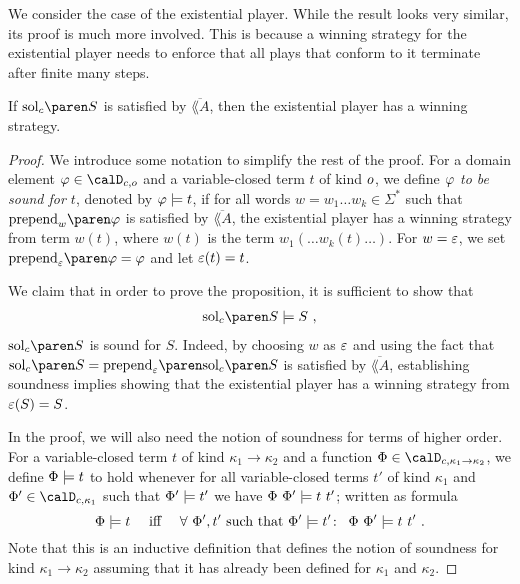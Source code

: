 \documentclass[../../diss.tex]{subfiles}
\begin{document}
We consider the case of the existential player.
While the result looks very similar, its proof is much more involved.
This is because a winning strategy for the existential player needs to enforce that all plays that conform to it terminate after finite many steps.

\begin{proposition}%
\label{Proposition:HORSConcreteSolExistential}%
    If $\solc{S}$ is satisfied by $\overline{\lang{A}}$, then the existential player has a winning strategy.
\end{proposition}

\begin{proof}
    We introduce some notation to simplify the rest of the proof.
    For a domain element
    $\judgmentground \in \domainc{\ground}$
    and a variable-closed term $t$ of kind $o$, we define \emph{$\varphi$ to be sound for $t$}, denoted by $\varphi \models t$, if for all words $w = w_1 \ldots w_k \in \Sigma^*$ such that
    $\prepend{w}{\judgmentground}$
    is satisfied by $\overline{\lang{A}}$, the existential player has a winning strategy from term $w(t)$, where $w(t)$ is the term $w_1 ( \ldots w_k (t) \ldots )$.
    For $w=\varepsilon$, we set $\prepend{\eps}{\judgmentground}=\judgmentground$ and let $\varepsilon(t)=t$.

    We claim that in order to prove the proposition, it is sufficient to show that
    \begin{align*}
        \solc{S} \gamesound S
        \ ,
    \end{align*}
    \ie $\solc{S}$ is sound for $S$.
    Indeed, by choosing $w$ as $\varepsilon$ and using the fact that $\solc{S} =  \prepend{\eps}{\solc{S}}$ is satisfied by $\overline{\lang{A}}$, establishing soundness implies showing that the existential player has a winning strategy from $\varepsilon(S) = S$.

    In the proof, we will also need the notion of soundness for terms of higher order.
    For a variable-closed term $t$ of kind
    $\kappa_1 \to \kappa_2$
    and a function
    $\judgment \in \domainc{\kappa_1 \to \kappa_2}$,
    we define
    $\Phi \models t$
    to hold whenever for all variable-closed terms $t'$ of kind $\kappa_1$ and
    $\judgment' \in \domainc{\kappa_1}$
    such that
    $\Phi' \models t'$
    we have
    $\Phi \  \Phi' \models t \  t'$;
     written as formula
    \[
        \Phi \models t
        \quad
        {\text{ iff }}
        \quad
        \forall \  \Phi', t'
            \text{ such that }
            \Phi' \models t' \colon
            \enspace
                \Phi \  \Phi' \models t \  t'
        \ .
    \]
    Note that this is an inductive definition that defines the notion of soundness for kind $\kappa_1 \to \kappa_2$ assuming that it has already been defined for $\kappa_1$ and $\kappa_2$.


\end{proof}
\end{document}
